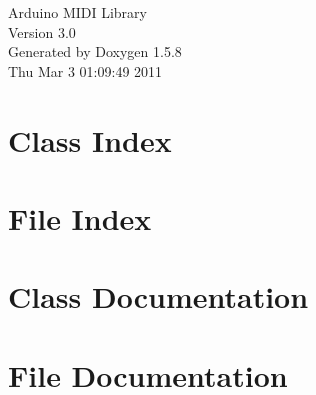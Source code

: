 \documentclass[a4paper]{book}
\begin{document}
\begin{titlepage}
\vspace*{7cm}
\begin{center}
{\Large Arduino MIDI Library \\[1ex]\large Version 3.0 }\\
\vspace*{1cm}
{\large Generated by Doxygen 1.5.8}\\
\vspace*{0.5cm}
{\small Thu Mar 3 01:09:49 2011}\\
\end{center}
\end{titlepage}
\clearemptydoublepage
{}
\tableofcontents
\clearemptydoublepage
{}
\chapter{Class Index}

\chapter{File Index}

\chapter{Class Documentation}


\chapter{File Documentation}


\printindex
\end{document}
